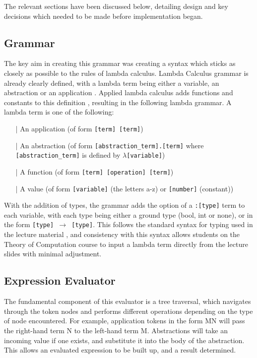 \documentclass[a4paper,12pt]{report}
\begin{document}
The relevant sections have been discussed below, detailing design and key decisions which needed to be made before implementation began. %

\subsection{Grammar}

The key aim in creating this grammar was creating a syntax which sticks as closely as possible to the rules of lambda calculus. Lambda Calculus grammar is already clearly defined, with a lambda term being either a variable, an abstraction or an application \cite{Hankin2004}. Applied lambda calculus adds functions and constants to this definition \cite{Slonneger1995}, resulting in the following lambda grammar. A lambda term is one of the following:

\begin{itemize}
\item[|] An application (of form \texttt{[term] [term]})
\item[|] An abstraction (of form \texttt{[abstraction_term].[term]} where \texttt{[abstraction_term]} is defined by \texttt{$\lambda$[variable]})
\item[|] A function (of form \texttt{[term] [operation] [term]})
\item[|] A value (of form \texttt{[variable]} (the letters a-z) or \texttt{[number]} (constant))
\end{itemize}

With the addition of types, the grammar adds the option of a \texttt{:[type]} term to each variable, with each type being either a ground type (bool, int or none), or in the form \texttt{[type] $\rightarrow$ [type]}. This follows the standard syntax for typing used in the lecture material \cite{Hankin2004} \cite{Gay2019}, and consistency with this syntax allows students on the Theory of Computation course to input a lambda term directly from the lecture slides with minimal adjustment.

\subsection{Expression Evaluator}

The fundamental component of this evaluator is a tree traversal, which navigates through the token nodes and performs different operations depending on the type of node encountered. For example, application tokens in the form MN will pass the right-hand term N to the left-hand term M. Abstractions will take an incoming value if one exists, and substitute it into the body of the abstraction. This allows an evaluated expression to be built up, and a result determined.\\
\end{document}
